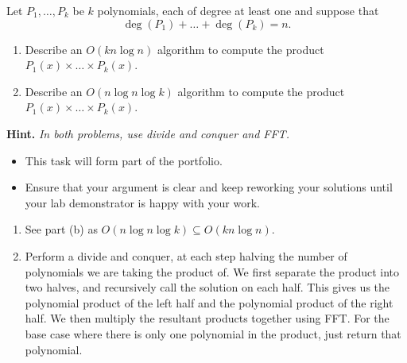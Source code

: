 \documentclass{article}
\begin{document}
\begin{question}
Let $P_1, \dots, P_k$ be $k$ polynomials, each of degree at least one and suppose that \[\deg(P_1) + \dots + \deg(P_k) = n.\]

\begin{enumerate}[label = (\alph*)]
    \item Describe an $O(kn\log n)$ algorithm to compute the product $P_1(x) \times \dots \times P_k(x)$.

    \item Describe an $O(n \log n \log k)$ algorithm to compute the product $P_1(x) \times \dots \times P_k(x)$.
\end{enumerate}

{\bfseries Hint.} {\em In both problems, use divide and conquer and FFT.}
\end{question}

\begin{rubric}
\begin{itemize}
    \item This task will form part of the portfolio.
    \item Ensure that your argument is clear and keep reworking your solutions until your lab demonstrator is happy with your work.
\end{itemize}
\end{rubric}

\begin{solution}
\begin{enumerate}[label = (\alph*)]
    \item See part (b) as $O(n\log n\log k)\subseteq O(kn\log n)$.


    \item Perform a divide and conquer, at each step halving the number of polynomials we are taking the product of. 
    We first separate the product into two halves, and recursively call the solution on each half.
    This gives us the polynomial product of the left half and the polynomial product of the right half. 
    We then multiply the resultant products together using FFT.
    For the base case where there is only one polynomial in the product, just return that polynomial.



\end{enumerate}
\end{solution}
\end{document}
